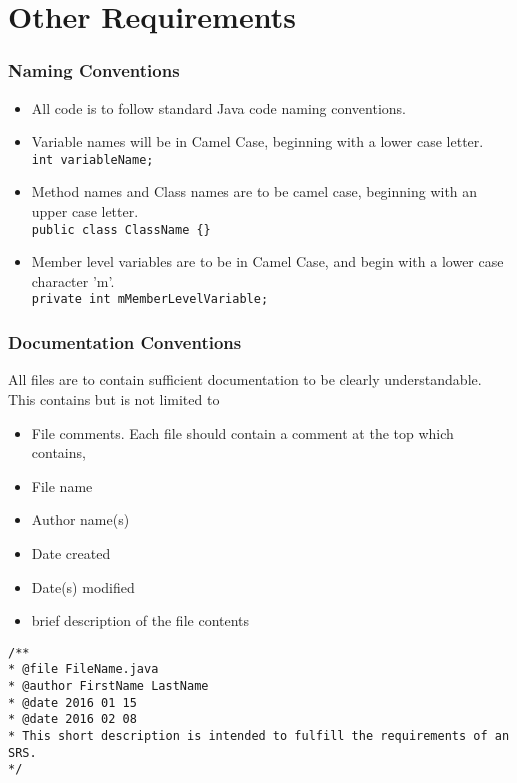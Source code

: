 \documentclass{scrreprt}
\begin{document}
\chapter{Other Requirements}


\subsection{Naming Conventions}
\begin{itemize}
\item All code is to follow standard Java code naming conventions.
\item Variable names will be in Camel Case, beginning with a lower case letter.\\
\texttt{int variableName;}
\item Method names and Class names are to be camel case, beginning with an upper case letter. \\
\texttt{public class ClassName \{\}}
\item Member level variables are to be in Camel Case, and begin with a lower case character 'm'. \\
\texttt{private int mMemberLevelVariable;}
\end{itemize}

\subsection{Documentation Conventions}
All files are to contain sufficient documentation to be clearly understandable. This 
contains but is not limited to
\begin{itemize}
\item File comments. Each file should contain a comment at the top which contains,
\item File name
\item Author name(s)
\item Date created
\item Date(s) modified
\item brief description of the file contents
\end{itemize}

\texttt{/** \\}
\texttt{* @file FileName.java \\}
\texttt{* @author FirstName LastName\\}
\texttt{* @date 2016 01 15 \\}
\texttt{* @date 2016 02 08\\}
\texttt{* This short description is intended to fulfill the requirements of an SRS. \\}
\texttt{*/ \\}
\end{document}

